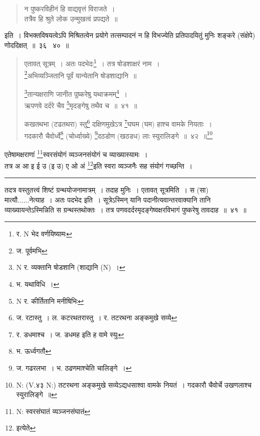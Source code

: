 \documentclass[11pt, openany]{book}
\begin{document}
\begin{quote}
{\qt  न पुष्करविहीनं हि वाद्यवृत्तं विराजते~।\\
 तत्रैव हि श्रुते लोक उन्मुखत्वं प्रपद्यते~॥}
\end{quote}

\noindent
इति~। विभक्तविषयत्वेऽपि मिश्रितत्वेन प्रयोगे तत्सम्पादनं न हि विभज्येति प्रतिपादयितुं मुनिः शङ्करे (संक्षेपे) णोददिक्षत्~॥~३६ \textendash\ ४०~॥

\newpage

\begin{quote}
{\na  एतावत् सूत्रम्~। अतः पदभेदः\renewcommand{\thefootnote}{1}\footnote{र. N भेद वर्णयिष्यामः}~। तत्र षोडशाक्षरं नाम~।\\
 \renewcommand{\thefootnote}{2}\footnote{ज. पूर्वमभि}अभिव्यञ्जितानि पूर्वं यान्येतानि षोडशाद्यानि~॥

 \renewcommand{\thefootnote}{3}\footnote{N र. व्यक्तानि षोडशानि  (शाद्यानि (N)~।}तान्यक्षराणि जानीत पुष्करेषु यथाक्रमम्\renewcommand{\thefootnote}{4}\footnote{भ. यथाविधि~।}~।\\
 ऋपणवे दर्दरे चैव \renewcommand{\thefootnote}{5}\footnote{N र. कीर्तितानि मनीषिभिः}मृदङ्गेषु तथैव च~॥~४१~॥

 कखतथभा (टढतथरा) स्तु\renewcommand{\thefootnote}{6}\footnote{ज. रटास्तु~। ल. कटरथतरास्तु~। र. तटरथना अङ्कमुखे सव्ये} दक्षिणमुखेऽत्र \renewcommand{\thefootnote}{7}\footnote{र. डधमाश्च~। ज. डधमह इति ह वामे स्युः}घघम (घम) हाश्च  वामके नियताः~। \\
 गदकारौ चैवोर्ध्वे\renewcommand{\thefootnote}{8}\footnote{भ. ऊर्ध्वगतौ} (चोर्ध्वाख्ये) \renewcommand{\thefootnote}{9}\footnote{ज. गढरलभा~। भ. ठढणमाश्चेति चालिङ्गे~।}दठडोण (खठडध) लाः स्युरालिङ्गे~॥~४२~॥\renewcommand{\thefootnote}{9a}\footnote{N: (V.४३ N:) तटरथना अङ्कमुखे सव्येऽद्यधसाश्वा वामके नियतं~। गदकारौ चैवोर्चे उखणलाश्च स्युरालिङ्गे~॥}}
\end{quote}

{\na एतेषामक्षराणां \renewcommand{\thefootnote}{9b}\footnote{N: स्वरसंघातं व्यञ्जनसंघातं}स्वरसंयोगं व्यञ्जनसंयोगं च व्याख्यास्यामः~।\\
 तत्र अ आ इ ई उ (इ उ) ए ओ अं \renewcommand{\thefootnote}{10}\footnote{इत्येते}इति स्वरा व्यञ्जनैः सह संयोगं गच्छन्ति~।}

\vspace{2mm}
\hrule

\vspace{2mm}
तदत्र वस्तुतत्त्वं शिष्टं ग्रन्थयोजनामात्रम्~। तदाह मुनिः~। {\qtt एतावत् सूत्रमिति}~। स (सा) मात्यौ......नेत्याह~। अतः पदभेद इति~। सूत्रेऽस्मिन् यानि पदानीत्यवान्तरवाक्यानि तानि व्याख्यायन्तेऽस्मिन्निति स ग्रन्थस्तथोक्तः~। तत्र पणवदर्दरमृदङ्गेष्वक्षरविभागं पुष्करेषु तावदाह~॥~४१~॥
\end{document}
